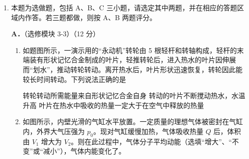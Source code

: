 \documentclass[\gkver]{gaokaozhenti}
\begin{document}
\begin{enumerate}

\item
本题为选做题，包括 A、B、C 三小题，请选定其中两题，并在相应的答题区域内作答。若三题都做，则按 A、B 两题评分。

\textbf{A．}（选修模块 3-3）（12 分）

\begin{enumerate}
	\item
	如题图所示，一演示用的“永动机”转轮由 5 根轻杆和转轴构成，轻杆的末端装有形状记忆合金制成的叶片，轻推转轮后，进入热水的叶片因伸展而“划水”，推动转轮转动。离开热水后，叶片形状迅速恢复，转轮因此能较长时间转动。下列说法正确的是

	\onepicture[w=3.67cm]{}

	{转轮转动所需能量来自形状记忆合金自身}
	{转动的叶片不断搅动热水，水温升高}
	{叶片在热水中吸收的热量一定大于在空气中释放的热量}
	\item
	如图所示，内壁光滑的气缸水平放置。一定质量的理想气体被密封在气缸内，外界大气压强为 $p_{0}$。现对气缸缓慢加热，气体吸收热量 $Q$ 后，体积由 $V_{1}$ 增大为 $V_{2}$。则在此过程中，气体分子平均动能（选填“增大”、“不变”或“减小”），气体内能变化了。


\end{enumerate}
\end{enumerate}
\end{document}
